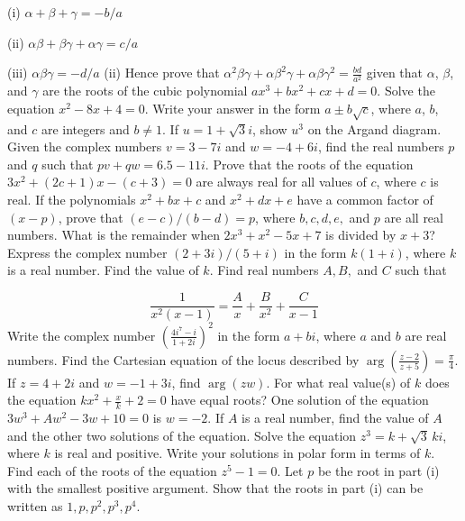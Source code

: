\documentclass[12pt,addpoints]{exam}
\begin{document}
\begin{questions}
(i) \(\alpha + \beta + \gamma = -b/a\)

(ii) \(\alpha\beta + \beta\gamma + \alpha\gamma = c/a\)

(iii) \(\alpha\beta\gamma = -d/a\)
\fillwithlines{5cm}
\question[5] (ii) Hence prove that \(\alpha^2\beta\gamma + \alpha\beta^2\gamma + \alpha\beta\gamma^2 = \frac{bd}{a^2}\) given that \(\alpha\), \(\beta\), and \(\gamma\) are the roots of the cubic polynomial \(ax^3 + bx^2 + cx + d = 0\).
\fillwithlines{5cm}
\question[5] Solve the equation \(x^2 - 8x + 4 = 0\). Write your answer in the form \(a \pm b\sqrt{c}\), where \(a\), \(b\), and \(c\) are integers and \(b \neq 1\).
\fillwithlines{5cm}
\question[5] If \( u = 1 + \sqrt{3}i \), show \( u^3 \) on the Argand diagram.
\fillwithlines{5cm}
\question[5] Given the complex numbers \( v = 3 - 7i \) and \( w = -4 + 6i \), find the real numbers \( p \) and \( q \) such that \( pv + qw = 6.5 - 11i \).
\fillwithlines{5cm}
\question[5] Prove that the roots of the equation \( 3x^2 + (2c + 1)x - (c + 3) = 0 \) are always real for all values of \( c \), where \( c \) is real.
\fillwithlines{5cm}
\question[5] If the polynomials \(x^2 + bx + c\) and \(x^2 + dx + e\) have a common factor of \((x - p)\), prove that \((e - c) / (b - d) = p\), where \(b, c, d, e,\) and \(p\) are all real numbers.
\fillwithlines{5cm}
\question[5] What is the remainder when \(2x^3 + x^2 - 5x + 7\) is divided by \(x + 3\)?
\fillwithlines{5cm}
\question[5] Express the complex number \((2 + 3i) / (5 + i)\) in the form \(k(1 + i)\), where \(k\) is a real number. Find the value of \(k\).
\fillwithlines{5cm}
\question[5] Find real numbers \( A, B, \) and \( C \) such that

\[
\frac{1}{x^2(x-1)} = \frac{A}{x} + \frac{B}{x^2} + \frac{C}{x-1}
\]
\fillwithlines{5cm}
\question[5] Write the complex number \(\left( \frac{4i^7 - i}{1 + 2i} \right)^2\) in the form \( a + bi \), where \( a \) and \( b \) are real numbers.
\fillwithlines{5cm}
\question[5] Find the Cartesian equation of the locus described by \(\arg \left( \frac{z - 2}{z + 5} \right) = \frac{\pi}{4}\).
\fillwithlines{5cm}
\question[5] If \( z = 4 + 2i \) and \( w = -1 + 3i \), find \(\arg(zw)\).
\fillwithlines{5cm}
\question[5] For what real value(s) of \( k \) does the equation \( kx^2 + \frac{x}{k} + 2 = 0 \) have equal roots?
\fillwithlines{5cm}
\question[5] One solution of the equation \( 3w^3 + Aw^2 - 3w + 10 = 0 \) is \( w = -2 \). If \( A \) is a real number, find the value of \( A \) and the other two solutions of the equation.
\fillwithlines{5cm}
\question[5] Solve the equation \( z^3 = k + \sqrt{3} \, ki \), where \( k \) is real and positive. Write your solutions in polar form in terms of \( k \).
\fillwithlines{5cm}
\question[5] Find each of the roots of the equation \( z^5 - 1 = 0 \).
\fillwithlines{5cm}
\question[5] Let \( p \) be the root in part (i) with the smallest positive argument. Show that the roots in part (i) can be written as \( 1, p, p^2, p^3, p^4 \).


\end{questions}
\end{document}
